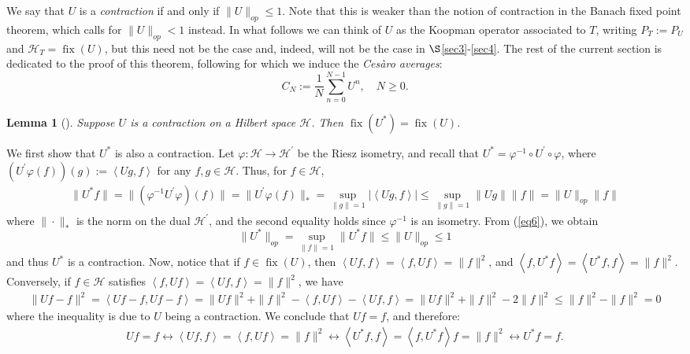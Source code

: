 \documentclass[11pt]{report}
\newcommand{\mc}[1]{\mathcal{#1}}
\newcommand{\ip}[2]{\left\langle#1,#2\right\rangle }
\newcommand{\1}[1]{\mathbbm{1}_{\{#1\}}}
\DeclareMathOperator{\fix}{fix}
\newtheorem{lemma}{Lemma}[section]
\theoremstyle{definition}
\begin{document}
    We say that $U$ is a \textit{contraction} if and only if $\|U\|_{op}\leq 1$. Note that this
    is weaker than the notion of contraction in the Banach fixed point theorem, which calls for $\|U\|_{op}<1$ instead.
    In what follows we can think of $U$ as the Koopman operator associated to $T$, writing $P_T:=P_{U}$ and $\mc{H}_T=\fix(U)$, but this need not be the case and, indeed, will
    not be the case in $\S$\ref{sec3}-\ref{sec4}.
    The rest of the current section is dedicated to the proof of
    this theorem, following \cite[theorem 1.3.1]{Weber_2000} for which we induce
    the \textit{Ces\`aro averages}:
    \[C_N:=\frac{1}{N}\sum_{n=0}^{N-1}U^n,\quad N\geq 0.\]
    \begin{lemma}[{\cite[lemma 1.3.2]{Weber_2000}}]\label{lem4}
        Suppose $U$ is a contraction on a Hilbert space $\mc{H}$. Then
        $\fix(U^\ast)=\fix(U)$. 
    \end{lemma}
     We first show that $U^\ast$ is also a
    contraction. Let $\varphi:\mc{H}\rightarrow\mc{H}^\prime$ be the Riesz
    isometry, and recall that $U^\ast=\varphi^{-1}\circ U^\prime\circ\varphi$,
    where $(U^\prime\varphi(f))(g):=\ip{Ug}{f}$ for any $f,g\in\mc{H}$. Thus,
    for $f\in\mc{H}$,
    \begin{align}
        \|U^\ast f\|=\|(\varphi^{-1}U^\prime\varphi)(f)\|=\|U^\prime\varphi(f)\|_\ast=\sup_{\|g\|=1}|\ip{Ug}{f}|\leq\sup_{\|g\|=1}\|Ug\|\|f\|=\|U\|_{op}\|f\|\label{eq6}
    \end{align}
    where $\|\cdot\|_\ast$ is the norm on the dual $\mc{H}^\prime$, and the second equality holds since $\varphi^{-1}$ is an isometry. From (\ref{eq6}), we obtain
    \[\|U^\ast\|_{op}=\sup_{\|f\|=1}\|U^\ast f\|\leq\|U\|_{op}\leq 1\]
    and thus $U^\ast$ is a contraction. Now, notice that if $f\in\fix(U)$, then $\ip{Uf}{f}=\ip{f}{Uf}=\|f\|^2$, and
    $\ip{f}{U^\ast f}=\ip{U^\ast f}{f}=\|f\|^2$. Conversely, if $f\in\mc{H}$
    satisfies $\ip{f}{Uf}=\ip{Uf}{f}=\|f\|^2$, we have
    \begin{align*}
        \|Uf-f\|^2=\ip{Uf-f}{Uf-f}=\|Uf\|^2+\|f\|^2-\ip{f}{Uf}-\ip{Uf}{f}=\|Uf\|^2+\|f\|^2-2\|f\|^2\leq \|f\|^2-\|f\|^2=0
    \end{align*}
    where the inequality is due to $U$ being a contraction. We conclude that
    $Uf=f$, and therefore:
    \begin{align*}
        Uf=f\longleftrightarrow \ip{Uf}{f}=\ip{f}{Uf}=\|f\|^2\longleftrightarrow \ip{U^\ast f}{f}=\ip{f}{U^\ast f}{f}=\|f\|^2\longleftrightarrow U^\ast f=f.\tag*{$\qed$}
    \end{align*}
\end{document}
